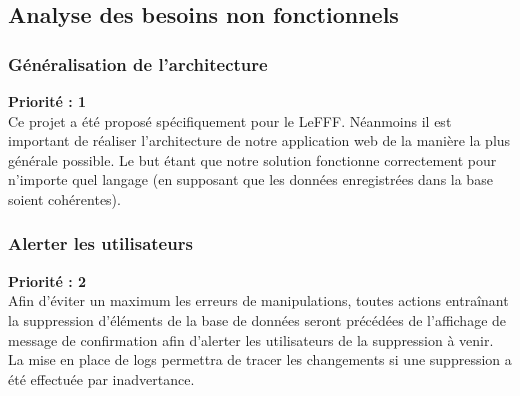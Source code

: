 \documentclass[12pt,a4paper]{article}
\begin{document}
    \subsection{Analyse des besoins non fonctionnels}

    \subsubsection{Généralisation de l'architecture}
    \textbf{Priorité : 1} \\
    Ce projet a été proposé spécifiquement pour le LeFFF. Néanmoins il est important de réaliser l'architecture de notre application web de la manière la plus générale possible.
    Le but étant que notre solution fonctionne correctement pour n'importe quel langage (en supposant que les données enregistrées dans la base soient cohérentes).

    \subsubsection{Alerter les utilisateurs}
    \textbf{Priorité : 2} \\
    Afin d'éviter un maximum les erreurs de manipulations, toutes actions entraînant la suppression d'éléments de la base de données seront précédées de l'affichage de message de confirmation afin d'alerter les utilisateurs de la suppression à venir.
    La mise en place de logs permettra de tracer les changements si une suppression a été effectuée par inadvertance.
\end{document}
